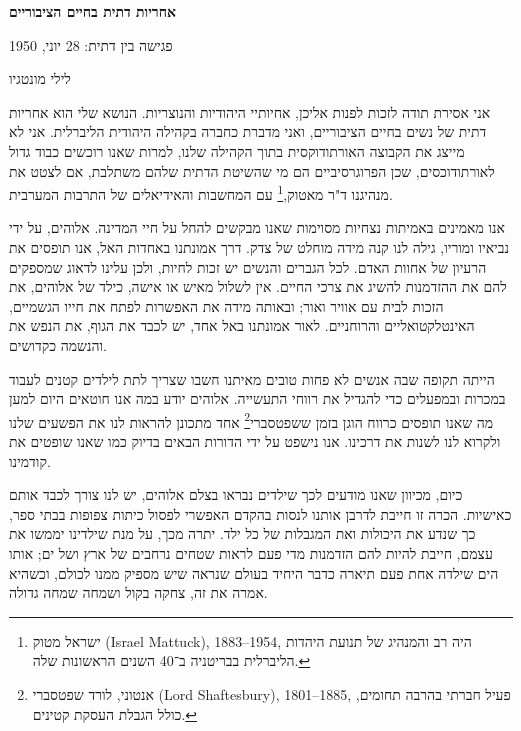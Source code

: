 \documentclass[12pt, extrafontsizes, twopage, a5paper]{memoir}
\begin{document}
{
  \centering\LARGE\bfseries אחריות דתית בחיים הציבוריים
  
  \large פגישה בין דתית: 28 יוני, 1950

  \Large לילי מונטגיו


  }

אני אסירת תודה לזכות לפנות אליכן, אחיותיי היהודיות והנוצריות. הנושא שלי הוא אחריות דתית של נשים בחיים הציבוריים, ואני מדברת כחברה בקהילה היהודית הליברלית. אני לא מייצג את הקבוצה האורתודוקסית בתוך הקהילה שלנו, למרות שאנו רוכשים כבוד גדול לאורתודוכסים, שכן הפרוגרסיביים הם מי שהשיטת הדתית שלהם משתלבת, אם לצטט את מנהיגנו ד"ר מאטוק,\footnote{ישראל מטוק (\textenglish{Israel Mattuck}), 1883--1954, היה רב והמנהיג של תנועת היהדות הליברלית בבריטניה ב־40 השנים
הראשונות שלה.}
עם המחשבות והאידיאלים של התרבות המערבית.

אנו מאמינים באמיתות נצחיות מסוימות שאנו מבקשים להחל על חיי המדינה. אלוהים, על ידי נביאיו ומוריו, גילה לנו קנה מידה מוחלט של צדק. דרך אמונתנו באחדות האל, אנו תופסים את הרעיון של אחוות האדם. לכל הגברים והנשים יש זכות לחיות, ולכן עלינו לדאוג שמספקים להם את ההזדמנות להשיג את צרכי החיים. אין לשלול מאיש או אישה, כילד של אלוהים, את הזכות לבית עם אוויר ואור; ובאותה מידה את האפשרות לפתח את חייו הגשמיים, האינטלקטואליים והרוחניים. לאור אמונתנו באל אחד, יש לכבד את הגוף, את הנפש את והנשמה כקדושים.

הייתה תקופה שבה אנשים לא פחות טובים מאיתנו חשבו שצריך לתת לילדים קטנים לעבוד במכרות ובמפעלים כדי להגדיל את רווחי התעשייה. אלוהים יודע במה אנו חוטאים היום למען מה שאנו תופסים כרווח הוגן בזמן ששפטסברי\footnote{אנטוני, לורד שפטסברי (\textenglish{Lord Shaftesbury}), 1801--1885, פעיל חברתי בהרבה תחומים, כולל הגבלת העסקת קטינים.}
אחד מתכונן להראות לנו את הפשעים שלנו ולקרוא לנו לשנות את דרכינו. אנו נישפט על ידי הדורות הבאים בדיוק כמו שאנו שופטים את קודמינו.

כיום, מכיוון שאנו מודעים לכך שילדים נבראו בצלם אלוהים, יש לנו צורך לכבד אותם כאישיות. הכרה זו חייבת לדרבן אותנו לנסות בהקדם האפשרי לפסול כיתות צפופות בבתי ספר, כך שנדע את היכולות ואת המגבלות של כל ילד. יתרה מכך, על מנת שילדינו יממשו את עצמם, חייבת להיות להם הזדמנות מדי פעם לראות שטחים נרחבים של ארץ ושל ים; אותו הים שילדה אחת פעם תיארה כדבר היחיד בעולם שנראה שיש מספיק ממנו לכולם, וכשהיא אמרה את זה, צחקה בקול ושמחה שמחה גדולה.
\end{document}
